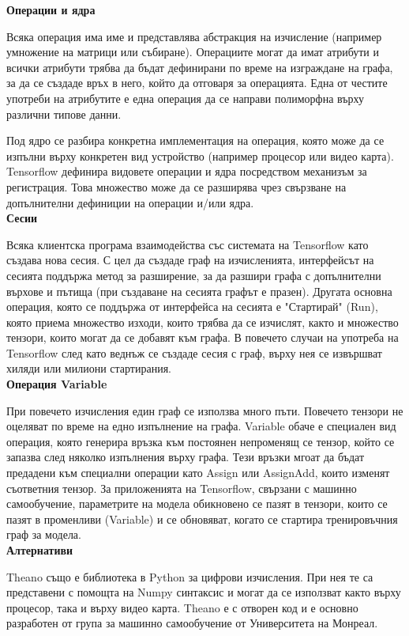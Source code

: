 \textbf{Операции и ядра}

Всяка операция има име и представлява абстракция на изчисление (например умножение на матрици или събиране). Операциите могат да имат атрибути и всички атрибути трябва да бъдат дефинирани по време на изграждане на графа, за да се създаде връх в него, който да отговаря за операцията. Една от честите употреби на атрибутите е една операция да се направи полиморфна върху различни типове данни.

Под ядро се разбира конкретна имплементация на операция, която може да се изпълни върху конкретен вид устройство (например процесор или видео карта). Tensorflow дефинира видовете операции и ядра посредством механизъм за регистрация. Това множество може да се разширява чрез свързване на допълнителни дефиниции на операции и/или ядра.\\

\textbf{Сесии}

Всяка клиентска програма взаимодейства със системата на Tensorflow като създава нова сесия. С цел да създаде граф на изчисленията, интерфейсът на сесията поддържа метод за разширение, за да разшири графа с допълнителни върхове и пътища (при създаване на сесията графът е празен). Другата основна операция, която се поддържа от интерфейса на сесията е "Стартирай" (Run), която приема множество изходи, които трябва да се изчислят, както и множество тензори, които могат да се добавят към графа. В повечето случаи на употреба на Tensorflow след като веднъж се създаде сесия с граф, върху нея се извършват хиляди или милиони стартирания.\\

\textbf{Операция Variable}

При повечето изчисления един граф се използва много пъти. Повечето тензори не оцеляват по време на едно изпълнение на графа. Variable обаче е специален вид операция, която генерира връзка към постоянен непроменящ се тензор, който се запазва след няколко изпълнения върху графа. Тези връзки мгоат да бъдат предадени към специални операции като Assign или AssignAdd, които изменят съответния тензор. За приложенията на Tensorflow, свързани с машинно самообучение, параметрите на модела обикновено се пазят в тензори, които се пазят в променливи (Variable) и се обновяват, когато се стартира тренировъчния граф за модела.\\

\textbf{Алтернативи}

Theano също е библиотека в Python за цифрови изчисления. При нея те са представени с помощта на Numpy синтаксис \cite{Theano} и могат да се използват както върху процесор, така и върху видео карта. Theano е с отворен код и е основно разработен от група за машинно самообучение от Университета на Монреал.

